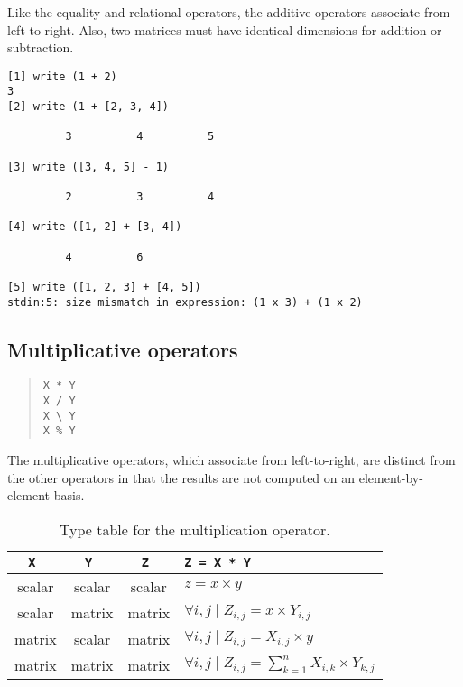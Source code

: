 Like the equality and relational operators, the additive operators
associate from left-to-right.  Also, two matrices must have identical
dimensions for addition or subtraction.

\begin{screen}
\begin{verbatim}
[1] write (1 + 2)
3
[2] write (1 + [2, 3, 4])

         3          4          5 

[3] write ([3, 4, 5] - 1)

         2          3          4 

[4] write ([1, 2] + [3, 4])

         4          6 

[5] write ([1, 2, 3] + [4, 5])
stdin:5: size mismatch in expression: (1 x 3) + (1 x 2)
\end{verbatim}
\end{screen}


\subsection{Multiplicative operators}
\label{burlap.op.multiplicative}

\begin{quote}
\begin{verbatim}
X * Y
X / Y
X \ Y
X % Y
\end{verbatim}
\end{quote}

The multiplicative operators, which associate from left-to-right, are
distinct from the other operators in that the results are not computed
on an element-by-element basis.

\begin{table}[htbp]
\begin{center}
\begin{tabular}{c|c|c|l}
\tt X  & \tt Y  & \tt Z  & \tt Z = X * Y				 \\
\hline
scalar & scalar & scalar & $z = x \times y$				 \\
scalar & matrix & matrix & $\forall i,j \mid Z_{i,j} = x \times Y_{i,j}$ \\
matrix & scalar & matrix & $\forall i,j \mid Z_{i,j} = X_{i,j} \times y$ \\
matrix & matrix & matrix & $\forall i,j \mid Z_{i,j} = \sum_{k=1}^{n} X_{i,k} \times Y_{k,j}$ \\
\end{tabular}
\caption{Type table for the multiplication operator.}
\label{burlap.multiplication.types}
\end{center}
\end{table}

